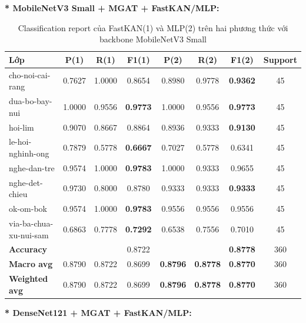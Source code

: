 \textbf{* MobileNetV3 Small + MGAT + FastKAN/MLP:}
\begin{table}[H]
\centering
\renewcommand{\arraystretch}{1.08}
\caption{\centering Classification report của FastKAN(1) và MLP(2) trên hai phương thức với backbone MobileNetV3 Small}
\begin{tabular}{lccccccc}
\hline \textbf{Lớp} & \textbf{P(1)} & \textbf{R(1)} & \textbf{F1(1)} & \textbf{P(2)} & \textbf{R(2)} & \textbf{F1(2)} & \textbf{Support} \\ \hline

cho-noi-cai-rang 
& 0.7627 & 1.0000 & 0.8654 
& 0.8980 & 0.9778 & \textbf{0.9362} & 45 \\

dua-bo-bay-nui
& 1.0000 & 0.9556 & \textbf{0.9773} 
& 1.0000 & 0.9556 & \textbf{0.9773} & 45 \\

hoi-lim
& 0.9070 & 0.8667 & 0.8864 
& 0.8936 & 0.9333 & \textbf{0.9130} & 45 \\

le-hoi-nghinh-ong
& 0.7879 & 0.5778 & \textbf{0.6667} 
& 0.7027 & 0.5778 & 0.6341 & 45 \\

nghe-dan-tre
& 0.9574 & 1.0000 & \textbf{0.9783} 
& 1.0000 & 0.9333 & 0.9655 & 45 \\

nghe-det-chieu
& 0.9730 & 0.8000 & 0.8780 
& 0.9333 & 0.9333 & \textbf{0.9333} & 45 \\

ok-om-bok
& 0.9574 & 1.0000 & \textbf{0.9783} 
& 0.9556 & 0.9556 & 0.9556 & 45 \\

via-ba-chua-xu-nui-sam
& 0.6863 & 0.7778 & \textbf{0.7292} 
& 0.6538 & 0.7556 & 0.7010 & 45 \\
\hline

\textbf{Accuracy}
& & & 0.8722
& & & \textbf{0.8778} & 360 \\

\textbf{Macro avg}
& 0.8790 & 0.8722 & 0.8699 
& \textbf{0.8796} & \textbf{0.8778} & \textbf{0.8770} & 360 \\

\textbf{Weighted avg}
& 0.8790 & 0.8722 & 0.8699 
& \textbf{0.8796} & \textbf{0.8778} & \textbf{0.8770} & 360 \\
\hline
\end{tabular}
\end{table}
\textbf{* DenseNet121 + MGAT + FastKAN/MLP:}
